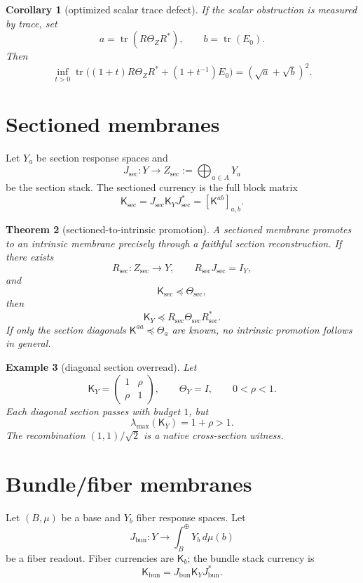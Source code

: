\documentclass[11pt]{article}
\newtheorem{theorem}{Theorem}[section]
\newtheorem{corollary}[theorem]{Corollary}
\newtheorem{example}[theorem]{Example}
\newcommand{\K}{\mathsf K}
\newcommand{\Th}{\Theta}
\newcommand{\tr}{\operatorname{tr}}
\newcommand{\Loewner}{\preceq}
\begin{document}
\begin{corollary}[optimized scalar trace defect]
If the scalar obstruction is measured by trace, set
\[
a=\tr(R\Th_ZR^*),\qquad b=\tr(E_0).
\]
Then
\[
\inf_{t>0}\tr\bigl((1+t)R\Th_ZR^*+(1+t^{-1})E_0\bigr)
=(\sqrt a+\sqrt b)^2.
\]
\end{corollary}

\section{Sectioned membranes}

Let \(Y_a\) be section response spaces and
\[
J_{\mathrm{sec}}:Y\to Z_{\mathrm{sec}}:=\bigoplus_{a\in A}Y_a
\]
be the section stack.  The sectioned currency is the full block matrix
\[
\K_{\mathrm{sec}}=J_{\mathrm{sec}}\K_YJ_{\mathrm{sec}}^*=[\K^{ab}]_{a,b}.
\]

\begin{theorem}[sectioned-to-intrinsic promotion]
A sectioned membrane promotes to an intrinsic membrane precisely through a faithful section reconstruction.  If there exists
\[
R_{\mathrm{sec}}:Z_{\mathrm{sec}}\to Y,
\qquad R_{\mathrm{sec}}J_{\mathrm{sec}}=I_Y,
\]
and
\[
\K_{\mathrm{sec}}\Loewner\Th_{\mathrm{sec}},
\]
then
\[
\K_Y\Loewner R_{\mathrm{sec}}\Th_{\mathrm{sec}}R_{\mathrm{sec}}^*.
\]
If only the section diagonals \(\K^{aa}\Loewner\Th_a\) are known, no intrinsic promotion follows in general.
\end{theorem}

\begin{example}[diagonal section overread]
Let
\[
\K_Y=\begin{pmatrix}1&\rho\\ \rho&1\end{pmatrix},
\qquad \Th_Y=I,
\qquad 0<\rho<1.
\]
Each diagonal section passes with budget \(1\), but
\[
\lambda_{\max}(\K_Y)=1+\rho>1.
\]
The recombination \((1,1)/\sqrt2\) is a native cross-section witness.
\end{example}

\section{Bundle/fiber membranes}

Let \((B,\mu)\) be a base and \(Y_b\) fiber response spaces.  Let
\[
J_{\mathrm{bun}}:Y\to \int_B^{\oplus}Y_b\,d\mu(b)
\]
be a fiber readout.  Fiber currencies are \(\K_b\); the bundle stack currency is
\[
\K_{\mathrm{bun}}=J_{\mathrm{bun}}\K_YJ_{\mathrm{bun}}^*.
\]
\end{document}
